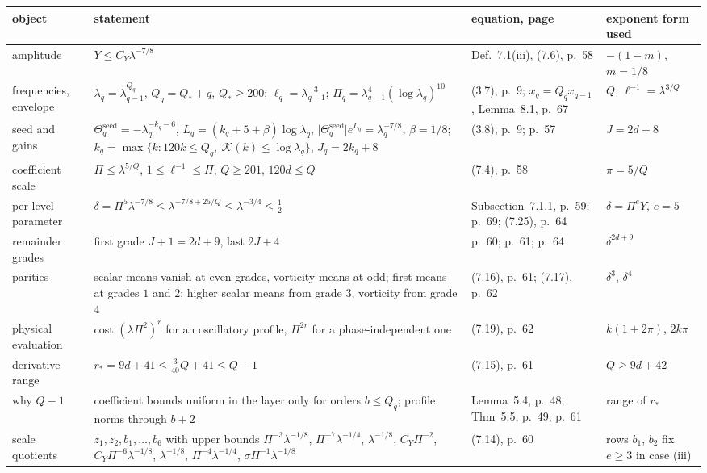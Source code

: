 \documentclass[11pt]{article}
\theoremstyle{remark}
\begin{document}
\begin{table}[t]
\centering\footnotesize
\setlength{\tabcolsep}{3pt}
\begin{tabular}{@{}L{3.1cm}L{4.7cm}L{3.5cm}L{3.6cm}@{}}
\toprule
object & statement & equation, page & exponent form used \\
\midrule
amplitude & $Y\le C_{Y}\lambda^{-7/8}$ & Def.~7.1(iii), (7.6), p.~58 & $-(1-m)$, $m=1/8$ \\
frequencies, envelope & $\lambda_{q}=\lambda_{q-1}^{Q_{q}}$, $Q_{q}=Q_{*}+q$, $Q_{*}\ge200$; $\ell_{q}=\lambda_{q-1}^{-3}$; $\Pi_{q}=\lambda_{q-1}^{4}(\log\lambda_{q})^{10}$ & (3.7), p.~9; $x_{q}=Q_{q}x_{q-1}$, Lemma~8.1, p.~67 & $Q$, $\ell^{-1}=\lambda^{3/Q}$ \\
seed and gains & $\Theta^{\mathrm{seed}}_{q}=-\lambda_{q}^{-k_{q}-6}$, $L_{q}=(k_{q}+5+\beta)\log\lambda_{q}$, $\lvert\Theta^{\mathrm{seed}}_{q}\rvert e^{L_{q}}=\lambda_{q}^{-7/8}$, $\beta=1/8$; $k_{q}=\max\{k:120k\le Q_{q},\ \mathcal K(k)\le\log\lambda_{q}\}$, $J_{q}=2k_{q}+8$ & (3.8), p.~9; p.~57 & $J=2d+8$ \\
coefficient scale & $\Pi\le\lambda^{5/Q}$, $1\le\ell^{-1}\le\Pi$, $Q\ge201$, $120d\le Q$ & (7.4), p.~58 & $\pi=5/Q$ \\
per-level parameter & $\delta=\Pi^{5}\lambda^{-7/8}\le\lambda^{-7/8+25/Q}\le\lambda^{-3/4}\le\tfrac12$ & Subsection~7.1.1, p.~59; p.~69; (7.25), p.~64 & $\delta=\Pi^{e}Y$, $e=5$ \\
remainder grades & first grade $J+1=2d+9$, last $2J+4$ & p.~60; p.~61; p.~64 & $\delta^{2d+9}$ \\
parities & scalar means vanish at even grades, vorticity means at odd; first means at grades $1$ and $2$; higher scalar means from grade $3$, vorticity from grade $4$ & (7.16), p.~61; (7.17), p.~62 & $\delta^{3}$, $\delta^{4}$ \\
physical evaluation & cost $(\lambda\Pi^{2})^{r}$ for an oscillatory profile, $\Pi^{2r}$ for a phase-independent one & (7.19), p.~62 & $k(1+2\pi)$, $2k\pi$ \\
derivative range & $r_{*}=9d+41\le\tfrac{3}{40}Q+41\le Q-1$ & (7.15), p.~61 & $Q\ge9d+42$ \\
why $Q-1$ & coefficient bounds uniform in the layer only for orders $b\le Q_{q}$; profile norms through $b+2$ & Lemma~5.4, p.~48; Thm~5.5, p.~49; p.~61 & range of $r_{*}$ \\
scale quotients & $z_{1},z_{2},b_{1},\dots,b_{6}$ with upper bounds $\Pi^{-3}\lambda^{-1/8}$, $\Pi^{-7}\lambda^{-1/4}$, $\lambda^{-1/8}$, $C_{Y}\Pi^{-2}$, $C_{Y}\Pi^{-6}\lambda^{-1/8}$, $\lambda^{-1/8}$, $\Pi^{-4}\lambda^{-1/4}$, $\sigma\Pi^{-1}\lambda^{-1/8}$ & (7.14), p.~60 & rows $b_{1}$, $b_{2}$ fix $e\ge3$ in case (iii) \\

\end{tabular}
\end{table}
\end{document}
